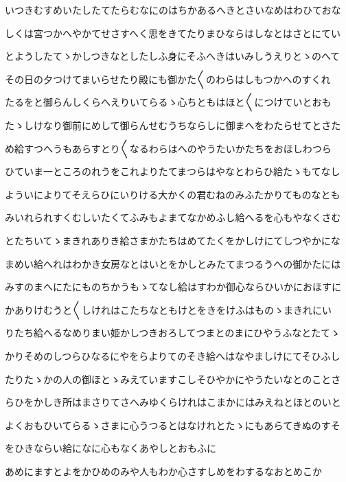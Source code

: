 \documentclass[a4paper,11pt,landscape]{ltjtarticle}
\begin{document}
\par\medskip
いつきむすめいたしたてたらむなにのはちかあるへきとさいなめはわひておな
\par\medskip
しくは宮つかへやかてせさすへく思をきてたりまひならはしなとはさとにてい
\par\medskip
とようしたてゝかしつきなとしたしふ身にそふへきはいみしうえりとゝのへて
\par\medskip
その日の夕つけてまいらせたり殿にも御かた〱のわらはしもつかへのすくれ
\par\medskip
たるをと御らんしくらへえりいてらるゝ心ちともはほと〱につけていとおも
\par\medskip
たゝしけなり御前にめして御らんせむうちならしに御まへをわたらせてとさた
\par\medskip
め給すつへうもあらすとり〱なるわらはへのやうたいかたちをおほしわつら
\par\medskip
ひていま一ところのれうをこれよりたてまつらはやなとわらひ給たゝもてなし
\par\medskip
よういによりてそえらひにいりける大かくの君むねのみふたかりてものなとも
\par\medskip
みいれられすくむしいたくてふみもよまてなかめふし給へるを心もやなくさむ
\par\medskip
とたちいてゝまきれありき給さまかたちはめてたくをかしけにてしつやかにな
\par\medskip
まめい給へれはわかき女房なとはいとをかしとみたてまつるうへの御かたには
\par\medskip
みすのまへにたにものちかうもゝてなし給はすわか御心ならひいかにおほすに
\par\medskip
かありけむうと〱しけれはこたちなともけとをきをけふはものゝまきれにい
\par\medskip
りたち給へるなめりまい姫かしつきおろしてつまとのまにひやうふなとたてゝ
\par\medskip
かりそめのしつらひなるにやをらよりてのそき給へはなやましけにてそひふし
\par\medskip
たりたゝかの人の御ほとゝみえていますこしそひやかにやうたいなとのことさ
\par\medskip
らひをかしき所はまさりてさへみゆくらけれはこまかにはみえねとほとのいと
\par\medskip
よくおもひいてらるゝさまに心うつるとはなけれとたゝにもあらてきぬのすそ
\par\medskip
をひきならい給になに心もなくあやしとおもふに
\par\medskip
あめにますとよをかひめのみや人もわか心さすしめをわするなおとめこか
\par\medskip
\end{document}
